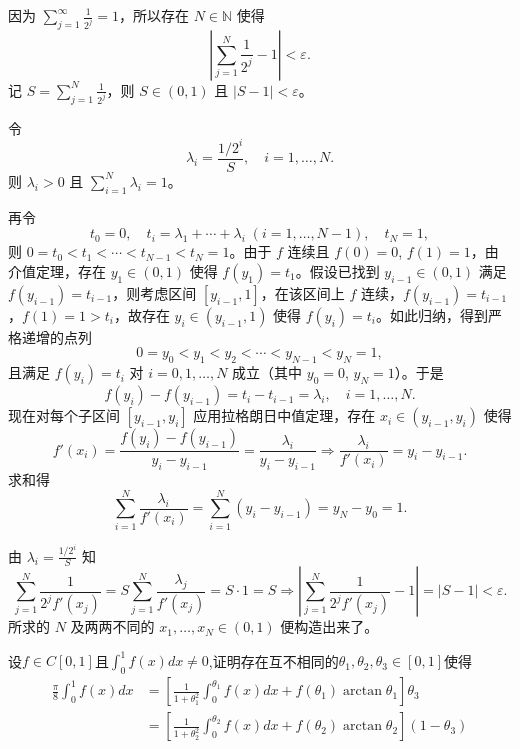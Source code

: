 \begin{solution}
因为 $\sum_{j=1}^{\infty}\frac{1}{2^j}=1$，所以存在 $N\in\mathbb{N}$ 使得
\[
\left|\sum_{j=1}^N\frac{1}{2^j}-1\right|<\varepsilon.
\]
记 $S=\sum_{j=1}^N\frac{1}{2^j}$，则 $S\in(0,1)$ 且 $|S-1|<\varepsilon$。

令
\[
\lambda_i=\frac{1/2^i}{S},\quad i=1,\dots,N.
\]
则 $\lambda_i>0$ 且 $\sum_{i=1}^N\lambda_i=1$。

再令
\[
t_0=0,\quad t_i=\lambda_1+\cdots+\lambda_i\;(i=1,\dots,N-1),\quad t_N=1,
\]
则 $0=t_0<t_1<\cdots<t_{N-1}<t_N=1$。由于 $f$ 连续且 $f(0)=0$, $f(1)=1$，由介值定理，存在 $y_1\in(0,1)$ 使得 $f(y_1)=t_1$。假设已找到 $y_{i-1}\in(0,1)$ 满足 $f(y_{i-1})=t_{i-1}$，则考虑区间 $[y_{i-1},1]$，在该区间上 $f$ 连续，$f(y_{i-1})=t_{i-1}$，$f(1)=1>t_i$，故存在 $y_i\in(y_{i-1},1)$ 使得 $f(y_i)=t_i$。如此归纳，得到严格递增的点列
\[
0=y_0<y_1<y_2<\cdots<y_{N-1}<y_N=1,
\]
且满足 $f(y_i)=t_i$ 对 $i=0,1,\dots,N$ 成立（其中 $y_0=0$, $y_N=1$）。于是
\[
f(y_i)-f(y_{i-1})=t_i-t_{i-1}=\lambda_i,\quad i=1,\dots,N.
\]
现在对每个子区间 $[y_{i-1},y_i]$ 应用拉格朗日中值定理，存在 $x_i\in(y_{i-1},y_i)$ 使得
\[
f'(x_i)=\frac{f(y_i)-f(y_{i-1})}{y_i-y_{i-1}}=\frac{\lambda_i}{y_i-y_{i-1}}\Rightarrow\frac{\lambda_i}{f'(x_i)}=y_i-y_{i-1}.
\]
求和得
\[
\sum_{i=1}^N\frac{\lambda_i}{f'(x_i)}=\sum_{i=1}^N(y_i-y_{i-1})=y_N-y_0=1.
\]

由 $\lambda_i=\frac{1/2^i}{S}$ 知
\[
\sum_{j=1}^N\frac{1}{2^j f'(x_j)}=S\sum_{j=1}^N\frac{\lambda_j}{f'(x_j)}=S\cdot1=S\Rightarrow \left|\sum_{j=1}^N\frac{1}{2^j f'(x_j)}-1\right|=|S-1|<\varepsilon.
\]
所求的 $N$ 及两两不同的 $x_1,\dots,x_N\in(0,1)$ 便构造出来了。
\end{solution}
\newpage
\begin{example}
    设$f\in C\left[0,1\right]$且$\int_0^1f\left(x\right)dx\neq0$,证明存在互不相同的$\theta_1,\theta_2,\theta_3\in[0,1]$使得
\begin{align*}\frac\pi8\int_0^1f\left(x\right)dx&=\left[\frac1{1+\theta_1^2}\int_0^{\theta_1}f\left(x\right)dx+f\left(\theta_1\right)\arctan\theta_1\right]\theta_3\\&=\left[\frac1{1+\theta_2^2}\int_0^{\theta_2}f\left(x\right)dx+f\left(\theta_2\right)\arctan\theta_2\right]\left(1-\theta_3\right)\end{align*}
\end{example}
